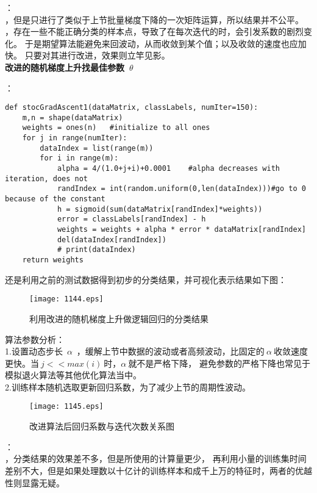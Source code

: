 ：\\
，但是只进行了类似于上节批量梯度下降的一次矩阵运算，所以结果并不公平。\\
，存在一些不能正确分类的样本点，导致了在每次迭代的时，会引发系数的剧烈变化。
于是期望算法能避免来回波动，从而收敛到某个值；以及收敛的速度也应加快。
只要对其进行改进，效果则立竿见影。\\


\noindent\textbf{改进的随机梯度上升找最佳参数~$\theta$~}\par
{}：
\begin{lstlisting}
def stocGradAscent1(dataMatrix, classLabels, numIter=150):
    m,n = shape(dataMatrix)
    weights = ones(n)   #initialize to all ones
    for j in range(numIter):
        dataIndex = list(range(m))
        for i in range(m):
            alpha = 4/(1.0+j+i)+0.0001    #alpha decreases with iteration, does not
            randIndex = int(random.uniform(0,len(dataIndex)))#go to 0 because of the constant
            h = sigmoid(sum(dataMatrix[randIndex]*weights))
            error = classLabels[randIndex] - h
            weights = weights + alpha * error * dataMatrix[randIndex]
            del(dataIndex[randIndex])
            # print(dataIndex)
    return weights
\end{lstlisting}


还是利用之前的测试数据得到初步的分类结果，并可视化表示结果如下图：
\begin{figure}[!htb]
  \centering
  \texttt{[image: 1144.eps]}
  \caption{利用改进的随机梯度上升做逻辑回归的分类结果}
\end{figure}


\noindent 算法参数分析：\\
\indent1.设置动态步长~$\alpha$~，缓解上节中数据的波动或者高频波动，比固定的$~\alpha~$收敛速度更快。当$~j<<max(i)~$时，$\alpha~$就不是严格下降，
避免参数的严格下降也常见于模拟退火算法等其他优化算法当中。\\
\indent2.训练样本随机选取更新回归系数，为了减少上节的周期性波动。

\begin{figure}[!htb]
  \centering
  \texttt{[image: 1145.eps]}
  \caption{改进算法后回归系数与迭代次数关系图}
\end{figure}

：\\
，分类结果的效果差不多，但是所使用的计算量更少，
再利用小量的训练集时间差别不大，但是如果处理数以十亿计的训练样本和成千上万的特征时，两者的优越性则显露无疑。

